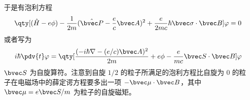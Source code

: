 于是有泡利方程
\begin{equation}
\qty[(\hat H-e\phi)-\frac{1}{2m}(\hat{\bvec P}-\frac{e}{c}\bvec A)^2+\frac{e}{2mc}\hbar\bvec \sigma\cdot \bvec B]\varphi=0
\end{equation}
或者写为
\begin{equation}
i\hbar\pdv{t} \varphi = \qty[\frac{(-i\hbar\nabla - (e/c)\bvec A)^2}{2m}+e\phi-\frac{e}{mc}\bvec S\cdot \bvec B]\varphi
\end{equation}
$\bvec S$ 为自旋算符。注意到自旋 $1/2$ 的粒子所满足的泡利方程比自旋为 $0$ 的粒子在电磁场中的薛定谔方程要多出一项 $-\bvec \mu\cdot \bvec B$，其中 $\bvec \mu=e\bvec S/m$ 为粒子的自旋磁矩。